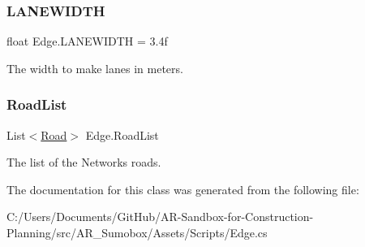 \subsubsection{\texorpdfstring{LANEWIDTH}{LANEWIDTH}}
{\footnotesize\ttfamily float Edge.\+L\+A\+N\+E\+W\+I\+D\+TH = 3.\+4f}



The width to make lanes in meters. 

\mbox{\label{class_edge_ada376fd8a81711e44ab425c32a85e844}} 
\subsubsection{\texorpdfstring{RoadList}{RoadList}}
{\footnotesize\ttfamily List$<$\mbox{\hyperlink{struct_road}{Road}}$>$ Edge.\+Road\+List}



The list of the Networks roads. 



The documentation for this class was generated from the following file\+:\begin{DoxyCompactItemize}
\item 
C\+:/\+Users/\+Documents/\+Git\+Hub/\+A\+R-\/\+Sandbox-\/for-\/\+Construction-\/\+Planning/src/\+A\+R\+\_\+\+Sumobox/\+Assets/\+Scripts/Edge.\+cs\end{DoxyCompactItemize}

